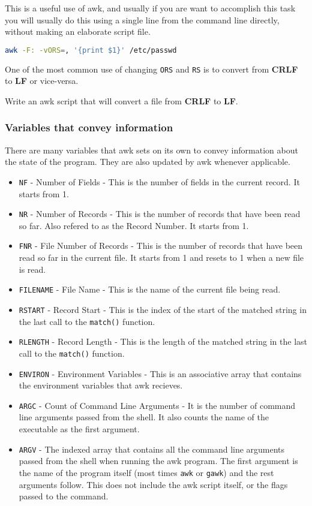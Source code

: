 This is a useful use of awk, and usually if you are want to accomplish this task you will usually do this using a single line from the command line directly, without making an elaborate script file.

\begin{lstlisting}[language=bash]
awk -F: -vORS=, '{print $1}' /etc/passwd
\end{lstlisting}

One of the most common use of changing \lstinline|ORS| and \lstinline|RS| is to convert from \textbf{CRLF} to \textbf{LF} or vice-versa.

\begin{exercise}
  Write an awk script that will convert a file from \textbf{CRLF} to \textbf{LF}.
\end{exercise}

\subsubsection{Variables that convey information}

There are many variables that awk sets on its own to convey information about the state of the program. They are also updated by awk whenever applicable.

\begin{itemize}
  \item \lstinline|NF| - Number of Fields - This is the number of fields in the current record. It starts from 1.
  \item \lstinline|NR| - Number of Records - This is the number of records that have been read so far. Also refered to as the Record Number. It starts from 1.
  \item \lstinline|FNR| - File Number of Records - This is the number of records that have been read so far in the current file. It starts from 1 and resets to 1 when a new file is read.
  \item \lstinline|FILENAME| - File Name - This is the name of the current file being read.
  \item \lstinline|RSTART| - Record Start - This is the index of the start of the matched string in the last call to the \lstinline|match()| function.
  \item \lstinline|RLENGTH| - Record Length - This is the length of the matched string in the last call to the \lstinline|match()| function.
  \item \lstinline|ENVIRON| - Environment Variables - This is an associative array that contains the environment variables that awk recieves.
  \item \lstinline|ARGC| - Count of Command Line Arguments - It is the number of command line arguments passed from the shell. It also counts the name of the executable as the first argument.
  \item \lstinline|ARGV| - The indexed array that contains all the command line arguments passed from the shell when running the awk program. The first argument is the name of the program itself (most times \lstinline|awk| or \lstinline|gawk|) and the rest arguments follow. This does not include the awk script itself, or the flags passed to the command.
\end{itemize}

